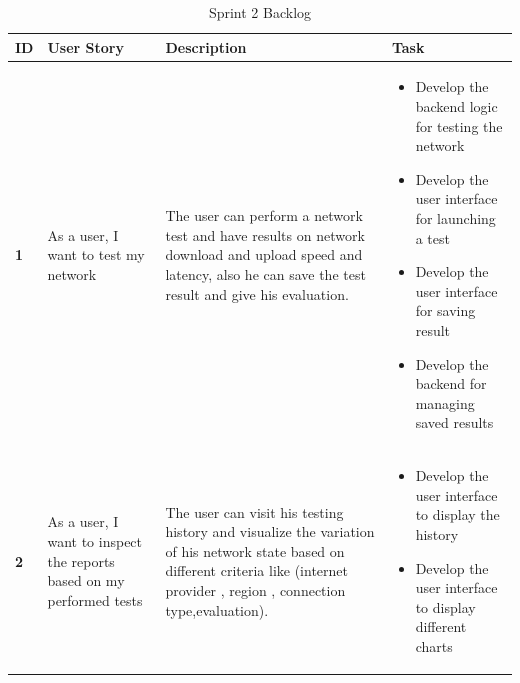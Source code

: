 \begin{table}[H]
    \renewcommand{\arraystretch}{1.2}
    \setlength{\belowcaptionskip}{0.25cm}
 
   \begin{tabular}{|p{}|p{}|p{}|p{}|}
   \hline
   \textbf{ID}  &  \textbf{User Story } & \textbf{Description} & \textbf{Task} \\ \hline


   
   \begin{center}
       \textbf{1}
   \end{center} & \begin{center}
       As a user, I want to test my network
   \end{center} &
   The user can perform a  network test and have results on network download and upload speed and latency, also he can  save the test result and give his evaluation.
   & 

       \begin{itemize}[left=0pt, label={\textbf{\Huge .}}]
            \item Develop the backend logic for testing the network
            \item Develop the user interface for  launching a test
            \item Develop the user interface for  saving result
            \item Develop the backend for managing  saved results
        \end{itemize} \\ \hline


   \begin{center}
       \textbf{2}
   \end{center} & \begin{center}
       As a  user, I want to inspect the reports based on my performed tests
   \end{center} &
   
  The  user can visit his testing history and visualize the variation of his network state based on different criteria like (internet provider , region , connection type,evaluation).  & 

       \begin{itemize}[left=0pt, label={\textbf{\Huge .}}]
            \item Develop the user interface to display the history
            \item Develop the user interface to display different charts 

        \end{itemize} \\ \hline
      
\end{tabular}
       \caption{Sprint 2 Backlog}
        \label{tab:my_label}
    
\end{table}



